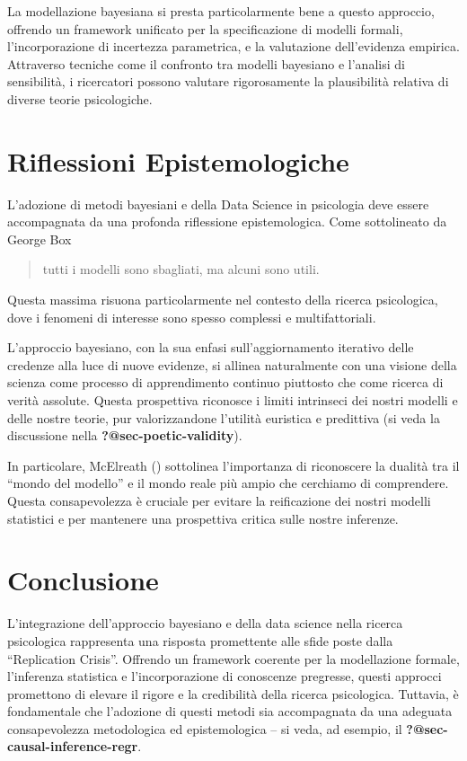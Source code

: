 \documentclass[
  letterpaper,
  DIV=11,
  numbers=noendperiod]{scrreprt}
\theoremstyle{definition}
\theoremstyle{remark}
\begin{document}
La modellazione bayesiana si presta particolarmente bene a questo
approccio, offrendo un framework unificato per la specificazione di
modelli formali, l'incorporazione di incertezza parametrica, e la
valutazione dell'evidenza empirica. Attraverso tecniche come il
confronto tra modelli bayesiano e l'analisi di sensibilità, i
ricercatori possono valutare rigorosamente la plausibilità relativa di
diverse teorie psicologiche.

\section{Riflessioni Epistemologiche}\label{riflessioni-epistemologiche}

L'adozione di metodi bayesiani e della Data Science in psicologia deve
essere accompagnata da una profonda riflessione epistemologica. Come
sottolineato da George Box

\begin{quote}
tutti i modelli sono sbagliati, ma alcuni sono utili.
\end{quote}

Questa massima risuona particolarmente nel contesto della ricerca
psicologica, dove i fenomeni di interesse sono spesso complessi e
multifattoriali.

L'approccio bayesiano, con la sua enfasi sull'aggiornamento iterativo
delle credenze alla luce di nuove evidenze, si allinea naturalmente con
una visione della scienza come processo di apprendimento continuo
piuttosto che come ricerca di verità assolute. Questa prospettiva
riconosce i limiti intrinseci dei nostri modelli e delle nostre teorie,
pur valorizzandone l'utilità euristica e predittiva (si veda la
discussione nella \textbf{?@sec-poetic-validity}).

In particolare, McElreath ()
sottolinea l'importanza di riconoscere la dualità tra il ``mondo del
modello'' e il mondo reale più ampio che cerchiamo di comprendere.
Questa consapevolezza è cruciale per evitare la reificazione dei nostri
modelli statistici e per mantenere una prospettiva critica sulle nostre
inferenze.

\section{Conclusione}\label{conclusione}

L'integrazione dell'approccio bayesiano e della data science nella
ricerca psicologica rappresenta una risposta promettente alle sfide
poste dalla ``Replication Crisis''. Offrendo un framework coerente per
la modellazione formale, l'inferenza statistica e l'incorporazione di
conoscenze pregresse, questi approcci promettono di elevare il rigore e
la credibilità della ricerca psicologica. Tuttavia, è fondamentale che
l'adozione di questi metodi sia accompagnata da una adeguata
consapevolezza metodologica ed epistemologica -- si veda, ad esempio, il
\textbf{?@sec-causal-inference-regr}.
\end{document}
